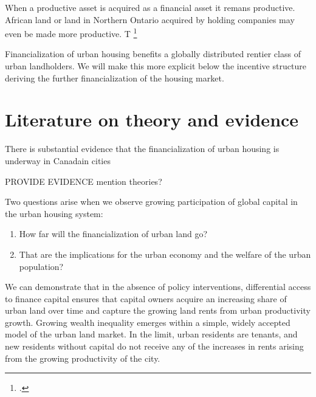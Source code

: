 When  a productive asset is acquired as a financial asset it remans productive. African land or land in Northern Ontario acquired by holding companies may even be made more productive. 
T%
\footnote{.} 

Financialization of urban housing benefits  a globally distributed rentier class of urban landholders. We will make this more explicit below the incentive structure deriving the further financialization of the housing market.

\section{Literature on theory and evidence}
{\color{red}There is substantial evidence that the financialization of urban housing is underway in Canadain cities

PROVIDE EVIDENCE 	mention theories?}


Two questions arise when we observe growing participation of global capital in the urban housing system: 
\begin{enumerate}
\item How far will the financialization of urban land go? 
\item That are the implications for the urban economy and the welfare of the urban population? 
\end{enumerate}

We can demonstrate  that  in the absence of policy interventions, differential access to finance capital ensures that capital owners acquire an increasing share of urban land over time and capture the growing  land rents  from urban productivity growth. Growing wealth inequality emerges within a simple, widely accepted model of the urban land market. In the limit,  urban residents are tenants, and new residents  without capital do  not receive any of the increases in rents arising from the growing productivity of the city. 





